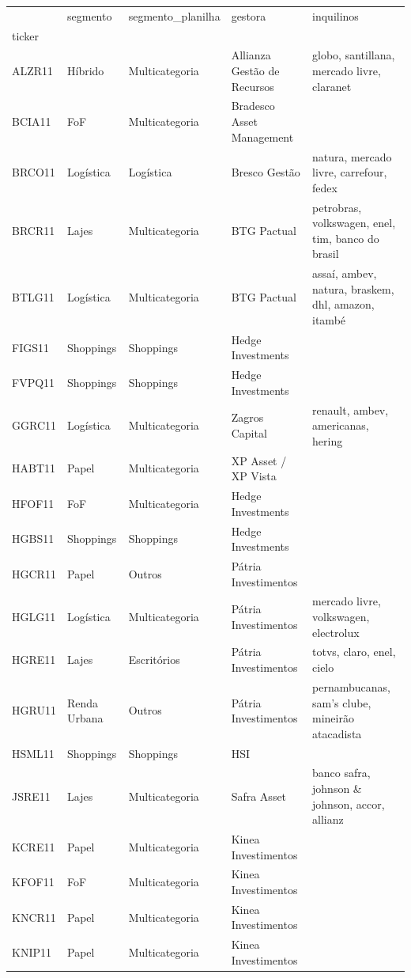 \begin{tabular}{lllll}
\toprule
 & segmento & segmento\_planilha & gestora & inquilinos \\
ticker &  &  &  &  \\
\midrule
ALZR11 & Híbrido & Multicategoria & Allianza Gestão de Recursos & globo, santillana, mercado livre, claranet \\
BCIA11 & FoF & Multicategoria & Bradesco Asset Management &  \\
BRCO11 & Logística & Logística & Bresco Gestão & natura, mercado livre, carrefour, fedex \\
BRCR11 & Lajes & Multicategoria & BTG Pactual & petrobras, volkswagen, enel, tim, banco do brasil \\
BTLG11 & Logística & Multicategoria & BTG Pactual & assaí, ambev, natura, braskem, dhl, amazon, itambé \\
FIGS11 & Shoppings & Shoppings & Hedge Investments &  \\
FVPQ11 & Shoppings & Shoppings & Hedge Investments &  \\
GGRC11 & Logística & Multicategoria & Zagros Capital & renault, ambev, americanas, hering \\
HABT11 & Papel & Multicategoria & XP Asset / XP Vista &  \\
HFOF11 & FoF & Multicategoria & Hedge Investments &  \\
HGBS11 & Shoppings & Shoppings & Hedge Investments &  \\
HGCR11 & Papel & Outros & Pátria Investimentos &  \\
HGLG11 & Logística & Multicategoria & Pátria Investimentos & mercado livre, volkswagen, electrolux \\
HGRE11 & Lajes & Escritórios & Pátria Investimentos & totvs, claro, enel, cielo \\
HGRU11 & Renda Urbana & Outros & Pátria Investimentos & pernambucanas, sam's clube, mineirão atacadista \\
HSML11 & Shoppings & Shoppings & HSI &  \\
JSRE11 & Lajes & Multicategoria & Safra Asset & banco safra, johnson \& johnson, accor, allianz \\
KCRE11 & Papel & Multicategoria & Kinea Investimentos &  \\
KFOF11 & FoF & Multicategoria & Kinea Investimentos &  \\
KNCR11 & Papel & Multicategoria & Kinea Investimentos &  \\
KNIP11 & Papel & Multicategoria & Kinea Investimentos &  \\

\end{tabular}
